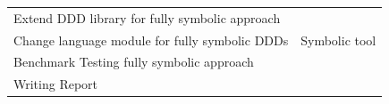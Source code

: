 \documentclass[11pt]{article}
\begin{document}
\begin{tabular}{@{}ll@{}}
Extend DDD library for fully symbolic approach  &                                                                             \\
Change language module for fully symbolic DDDs  & Symbolic tool                                                               \\
Benchmark Testing fully symbolic approach       &                                                                             \\
Writing Report                                  &                                                                             \\ \bottomrule
\end{tabular}

{}

\end{document}
